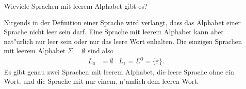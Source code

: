 Wieviele Sprachen mit leerem Alphabet gibt es?

\begin{loesung}
Nirgends in der Definition einer Sprache wird verlangt, dass das
Alphabet einer Sprache nicht leer sein darf. Eine Sprache mit leerem
Alphabet kann aber nat"urlich nur leer sein oder nur das leere Wort
enhalten. Die einzigen Sprachen mit leerem Alphabet $\Sigma=\emptyset$
sind also
\begin{align*}
L_0&=\emptyset& L_1=\Sigma^0=\{\varepsilon\}.
\end{align*}
Es gibt genau zwei Sprachen mit leerem Alphabet, die leere Sprache ohne
ein Wort, und die Sprache mit nur einem, n"amlich dem leeren Wort.
\end{loesung}
